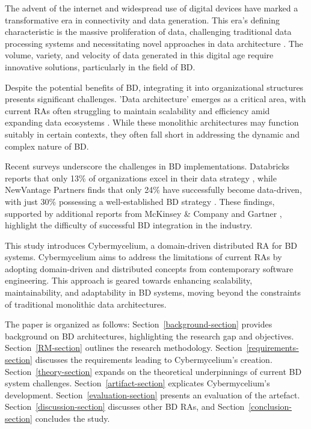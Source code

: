 \documentclass[review]{elsarticle}
\begin{document}
The advent of the internet and widespread use of digital devices have marked a transformative era in connectivity and data generation. This era's defining characteristic is the massive proliferation of data, challenging traditional data processing systems and necessitating novel approaches in data architecture \cite{AtaeiACIS,AtaeiBigDataEnvirons}. The volume, variety, and velocity of data generated in this digital age require innovative solutions, particularly in the field of BD.

Despite the potential benefits of BD, integrating it into organizational structures presents significant challenges. 'Data architecture' emerges as a critical area, with current RAs often struggling to maintain scalability and efficiency amid expanding data ecosystems \cite{Gorton,Nadal}. While these monolithic architectures may function suitably in certain contexts, they often fall short in addressing the dynamic and complex nature of BD.

Recent surveys underscore the challenges in BD implementations. Databricks reports that only 13\% of organizations excel in their data strategy \cite{DataBricksSurvey}, while NewVantage Partners finds that only 24\% have successfully become data-driven, with just 30\% possessing a well-established BD strategy \cite{NewVantageSurvey}. These findings, supported by additional reports from McKinsey \& Company \cite{analytics2016age} and Gartner \cite{Nash}, highlight the difficulty of successful BD integration in the industry.

This study introduces Cybermycelium, a domain-driven distributed RA for BD systems. Cybermycelium aims to address the limitations of current RAs by adopting domain-driven and distributed concepts from contemporary software engineering. This approach is geared towards enhancing scalability, maintainability, and adaptability in BD systems, moving beyond the constraints of traditional monolithic data architectures.

The paper is organized as follows: Section~\ref*{background-section} provides background on BD architectures, highlighting the research gap and objectives. Section~\ref*{RM-section} outlines the research methodology. Section~\ref*{requirements-section} discusses the requirements leading to Cybermycelium's creation. Section~\ref*{theory-section} expands on the theoretical underpinnings of current BD system challenges. Section~\ref*{artifact-section} explicates Cybermycelium's development. Section~\ref*{evaluation-section} presents an evaluation of the artefact. Section~\ref*{discussion-section} discusses other BD RAs, and Section~\ref*{conclusion-section} concludes the study.
\end{document}
